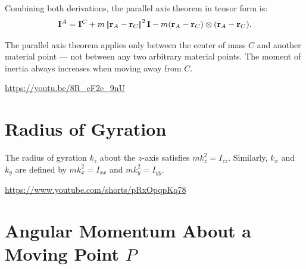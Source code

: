 \documentclass[
  letterpaper,
  DIV=11,
  numbers=noendperiod]{scrreprt}
\newcommand{\lnorm}{\left|\!\left|}
\newcommand{\rnorm}{\right|\!\right|}
\begin{document}
Combining both derivations, the parallel axis theorem in tensor form is:
\begin{align}
    {\bf I}^A = {\bf I}^C+m\lnorm{\bf r}_A-{\bf r}_C\rnorm^2{\bf I}-m({\bf r}_A-{\bf r}_C)\otimes({\bf r}_A-{\bf r}_C).
\end{align}

\begin{tcolorbox}[enhanced jigsaw, arc=.35mm, bottomrule=.15mm, bottomtitle=1mm, breakable, colback=white, colbacktitle=quarto-callout-important-color!10!white, colframe=quarto-callout-important-color-frame, coltitle=black, left=2mm, leftrule=.75mm, opacityback=0, opacitybacktitle=0.6, rightrule=.15mm, title=\textcolor{quarto-callout-important-color}{\faExclamation}\hspace{0.5em}{Note!}, titlerule=0mm, toprule=.15mm, toptitle=1mm]

The parallel axis theorem applies only between the center of mass \(C\)
and another material point --- not between any two arbitrary material
points. The moment of inertia always increases when moving away from
\(C\).

\end{tcolorbox}

\url{https://youtu.be/8R_cF2e_9nU}

\section{Radius of Gyration}\label{radius-of-gyration}

The radius of gyration \(k_z\) about the \(z\)-axis satisfies
\(mk_z^2 = I_{zz}\). Similarly, \(k_x\) and \(k_y\) are defined by
\(mk_x^2 = I_{xx}\) and \(mk_y^2=I_{yy}\).

\url{https://www.youtube.com/shorts/pRxOpqpKq78}

\section{\texorpdfstring{Angular Momentum About a Moving Point
\(P\)}{Angular Momentum About a Moving Point P}}\label{angular-momentum-about-a-moving-point-p}
\end{document}
